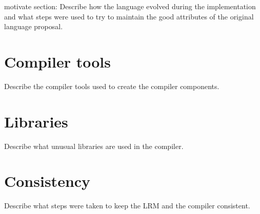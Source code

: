 motivate section:
Describe how the language evolved during the implementation and what steps
were used to try to maintain the good attributes of the original language proposal.

\section{Compiler tools}
Describe the compiler tools used to create the compiler components.

\section{Libraries}
Describe what unusual libraries are used in the compiler.

\section{Consistency}
Describe what steps were taken to keep the LRM and the compiler consistent.
